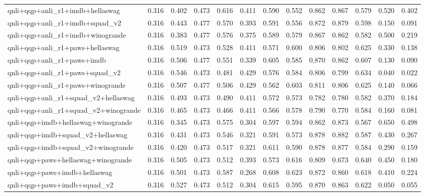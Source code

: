 \begin{table}[t]
\begin{tabular}{lrrrrrrrrrrrr}
    qnli+qqp+anli\_r1+imdb+hellaswag & 0.316 & 0.402 & 0.473 & 0.616 & 0.411 & 0.590 & 0.552 & 0.862 & 0.867 & 0.579 & 0.520 & 0.402 \\
    qnli+qqp+anli\_r1+imdb+squad\_v2 & 0.316 & 0.443 & 0.477 & 0.570 & 0.393 & 0.591 & 0.556 & 0.872 & 0.879 & 0.598 & 0.150 & 0.091 \\
    qnli+qqp+anli\_r1+imdb+winogrande & 0.316 & 0.383 & 0.477 & 0.576 & 0.375 & 0.589 & 0.579 & 0.867 & 0.862 & 0.582 & 0.500 & 0.219 \\
    qnli+qqp+anli\_r1+paws+hellaswag & 0.316 & 0.519 & 0.473 & 0.528 & 0.411 & 0.571 & 0.600 & 0.806 & 0.802 & 0.625 & 0.330 & 0.138 \\
    qnli+qqp+anli\_r1+paws+imdb & 0.316 & 0.506 & 0.477 & 0.551 & 0.339 & 0.605 & 0.585 & 0.870 & 0.862 & 0.607 & 0.130 & 0.090 \\
    qnli+qqp+anli\_r1+paws+squad\_v2 & 0.316 & 0.546 & 0.473 & 0.481 & 0.429 & 0.576 & 0.584 & 0.806 & 0.799 & 0.634 & 0.040 & 0.022 \\
    qnli+qqp+anli\_r1+paws+winogrande & 0.316 & 0.507 & 0.477 & 0.506 & 0.429 & 0.562 & 0.603 & 0.811 & 0.806 & 0.625 & 0.140 & 0.066 \\
    qnli+qqp+anli\_r1+squad\_v2+hellaswag & 0.316 & 0.493 & 0.473 & 0.490 & 0.411 & 0.572 & 0.573 & 0.782 & 0.780 & 0.582 & 0.370 & 0.184 \\
    qnli+qqp+anli\_r1+squad\_v2+winogrande & 0.316 & 0.465 & 0.473 & 0.466 & 0.411 & 0.566 & 0.578 & 0.790 & 0.770 & 0.584 & 0.160 & 0.081 \\
    qnli+qqp+imdb+hellaswag+winogrande & 0.316 & 0.345 & 0.473 & 0.575 & 0.304 & 0.597 & 0.594 & 0.862 & 0.873 & 0.567 & 0.650 & 0.498 \\
    qnli+qqp+imdb+squad\_v2+hellaswag & 0.316 & 0.431 & 0.473 & 0.546 & 0.321 & 0.591 & 0.573 & 0.878 & 0.882 & 0.587 & 0.430 & 0.267 \\
    qnli+qqp+imdb+squad\_v2+winogrande & 0.316 & 0.420 & 0.473 & 0.517 & 0.321 & 0.611 & 0.590 & 0.878 & 0.877 & 0.584 & 0.290 & 0.159 \\
    qnli+qqp+paws+hellaswag+winogrande & 0.316 & 0.505 & 0.473 & 0.512 & 0.393 & 0.573 & 0.616 & 0.809 & 0.673 & 0.640 & 0.450 & 0.180 \\
    qnli+qqp+paws+imdb+hellaswag & 0.316 & 0.501 & 0.473 & 0.587 & 0.268 & 0.608 & 0.623 & 0.872 & 0.860 & 0.618 & 0.410 & 0.224 \\
    qnli+qqp+paws+imdb+squad\_v2 & 0.316 & 0.527 & 0.473 & 0.512 & 0.304 & 0.615 & 0.595 & 0.870 & 0.863 & 0.622 & 0.050 & 0.055 \\

\end{tabular}
\end{table}
